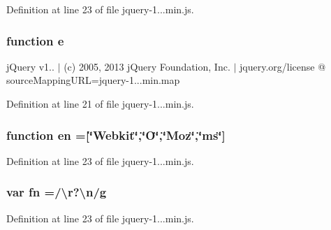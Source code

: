 Definition at line 23 of file jquery-\/1...\+min.\+js.

\hypertarget{_scripts_2jquery-1_810_82_8min_8js_a2c038346d47955cbe2cb91e338edd7e1}{}
\subsubsection[{e}]{\setlength{\rightskip}{0pt plus 5cm}function e}\label{_scripts_2jquery-1_810_82_8min_8js_a2c038346d47955cbe2cb91e338edd7e1}
j\+Query v1.. $\vert$ (c) 2005, 2013 j\+Query Foundation, Inc. $\vert$ jquery.\+org/license @ source\+Mapping\+U\+R\+L=jquery-\/1...\+min.\+map 

Definition at line 21 of file jquery-\/1...\+min.\+js.

\hypertarget{_scripts_2jquery-1_810_82_8min_8js_a5d7a777130eac935addcf4926a74b23c}{}
\subsubsection[{en}]{\setlength{\rightskip}{0pt plus 5cm}function en =\mbox{[}\char`\"{}Webkit\char`\"{},\char`\"{}O\char`\"{},\char`\"{}Moz\char`\"{},\char`\"{}ms\char`\"{}\mbox{]}}\label{_scripts_2jquery-1_810_82_8min_8js_a5d7a777130eac935addcf4926a74b23c}


Definition at line 23 of file jquery-\/1...\+min.\+js.

\hypertarget{_scripts_2jquery-1_810_82_8min_8js_a37b9e1ceee4c6d2616fa6081784b5468}{}
\subsubsection[{fn}]{\setlength{\rightskip}{0pt plus 5cm}var fn =/\textbackslash{}r?\textbackslash{}n/{\bf g}}\label{_scripts_2jquery-1_810_82_8min_8js_a37b9e1ceee4c6d2616fa6081784b5468}


Definition at line 23 of file jquery-\/1...\+min.\+js.

\hypertarget{_scripts_2jquery-1_810_82_8min_8js_a086b6295ec8d15f090cd7239137a4979}{}
